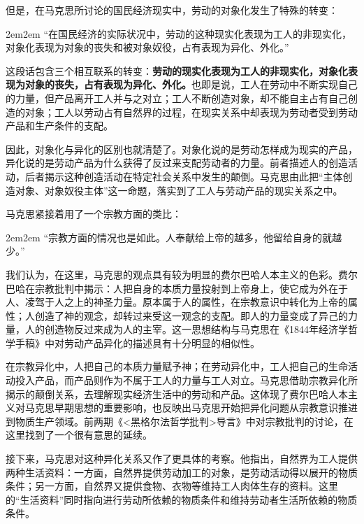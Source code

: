 \documentclass[a4paper,twoside,12pt,AutoFakeBold]{ctexart}
\begin{document}
但是，在马克思所讨论的国民经济现实中，劳动的对象化发生了特殊的转变：

\begin{adjustwidth}{2em}{2em}
\qquad\fangsong
“在国民经济的实际状况中，劳动的这种现实化表现为工人的非现实化，对象化表现为对象的丧失和被对象奴役，占有表现为异化、外化。”
\end{adjustwidth}

这段话包含三个相互联系的转变：\textbf{劳动的现实化表现为工人的非现实化，对象化表现为对象的丧失，占有表现为异化、外化。}也即是说，工人在劳动中不断实现自己的力量，但产品离开工人并与之对立；工人不断创造对象，却不能自主占有自己创造的对象；工人以劳动占有自然界的过程，在现实关系中却表现为劳动者受到劳动产品和生产条件的支配。

因此，对象化与异化的区别也就清楚了。对象化说的是劳动怎样成为现实的产品，异化说的是劳动产品为什么获得了反过来支配劳动者的力量。前者描述人的创造活动，后者揭示这种创造活动在特定社会关系中发生的颠倒。马克思由此把“主体创造对象、对象奴役主体”这一命题，落实到了工人与劳动产品的现实关系之中。

马克思紧接着用了一个宗教方面的类比：

\begin{adjustwidth}{2em}{2em}
\qquad\fangsong
“宗教方面的情况也是如此。人奉献给上帝的越多，他留给自身的就越少。”
\end{adjustwidth}

我们认为，在这里，马克思的观点具有较为明显的费尔巴哈人本主义的色彩。费尔巴哈在宗教批判中揭示：人把自身的本质力量投射到上帝身上，使它成为外在于人、凌驾于人之上的神圣力量。原本属于人的属性，在宗教意识中转化为上帝的属性；人创造了神的观念，却转过来受这一观念的支配。即人的力量变成了异己的力量，人的创造物反过来成为人的主宰。这一思想结构与马克思在《1844年经济学哲学手稿》中对劳动产品异化的描述具有十分明显的相似性。

在宗教异化中，人把自己的本质力量赋予神；在劳动异化中，工人把自己的生命活动投入产品，而产品则作为不属于工人的力量与工人对立。马克思借助宗教异化所揭示的颠倒关系，去理解现实经济生活中的劳动和产品。这体现了费尔巴哈人本主义对马克思早期思想的重要影响，也反映出马克思开始把异化问题从宗教意识推进到物质生产领域。前两期《<黑格尔法哲学批判>导言》中对宗教批判的讨论，在这里找到了一个很有意思的延续。

接下来，马克思对这种异化关系又作了更具体的考察。他指出，自然界为工人提供两种生活资料：一方面，自然界提供劳动加工的对象，是劳动活动得以展开的物质条件；另一方面，自然界又提供食物、衣物等维持工人肉体生存的资料。这里的“生活资料”同时指向进行劳动所依赖的物质条件和维持劳动者生活所依赖的物质条件。
\end{document}
